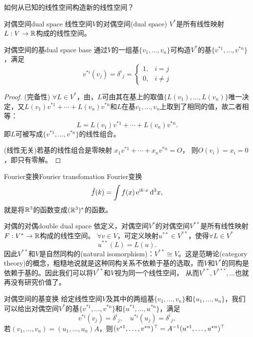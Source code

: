 如何从已知的线性空间构造新的线性空间？
\begin{definition}{对偶空间}{dual space}
	线性空间$V$的对偶空间(dual space) $V^\ast$是所有线性映射$L:V\to\mathbb R$构成的线性空间。
\end{definition}
\begin{theorem}{对偶空间的基}{dual space base}
	通过$V$的一组基$\{v_1,\ldots,v_n\}$可构造$V^\ast$的基$\{v^{\ast 1},\ldots,v^{\ast n}\}$，满足
	\begin{equation}
		v^{\ast i}(v_j)=\delta^i{}_j=
		\begin{cases}
			1,&i=j\\0,&i\neq j
		\end{cases}
	\end{equation}
\end{theorem}
\begin{proof}
	(完备性) $\forall L\in V^\ast$，由，$L$可由其在基上的取值$\{L(v_1),\ldots,L(v_n)\}$唯一决定，又$L(v_1)v^{\ast 1}+\cdots+L(v_n)v^{\ast n}$和$L$在基$v_1,\ldots,v_n$上取到了相同的值，故二者相等：
	\[
		L=L(v_1)v^{\ast 1}+\cdots+L(v_n)v^{\ast n}.
	\]
	即$L$可被写成$\{v^{\ast 1},\ldots,v^{\ast n}\}$的线性组合。

	(线性无关)若基的线性组合是零映射
	$x_1v^{\ast 1}+\cdots+x_nv^{\ast n}=O$，
	则$O(v_i)=x_i=0$，即只有零解。
\end{proof}
\begin{example}{Fourier变换}{Fourier transfomation}
	Fourier变换
	\[
		\hat f(k)=\int f(x)\mathop{}\!\mathrm{e}^{\mathrm{i} k\cdot x}\mathop{}\!\mathrm{d}^3x,
	\]
	就是将$\mathbb R^3$的函数变成$(\mathbb R^3)^\ast$的函数。
\end{example}
\begin{example}{对偶的对偶}{double dual space}
	依定义，对偶空间$V^\ast$的对偶空间$V^{\ast\ast}$是所有线性映射$F:V^\ast\to\mathbb R$构成的线性空间。%
	$\forall v\in V$，可定义映射$u^{\ast\ast}\in V^{\ast\ast}$，使得$\forall L\in V^\ast$
	\begin{equation}
		u^{\ast\ast}(L)=L(u).
	\end{equation}
	因此$V^{\ast\ast}$和$V$是自然同构的(natural isomorphism)：$V^{\ast\ast}\cong V$。这是范畴论(category theory)的概念，粗糙地说就是这种同构关系不依赖于基的选取，而$V$和$V^\ast$的同构是依赖于基的。因此我们可以将$V^{\ast\ast}$和$V$视为同一个线性空间，
	从而$V^{\ast\ast},V^{\ast\ast\ast},\ldots$也就再没有研究价值了。
\end{example}
\begin{theorem}{对偶空间的基变换}{}
	给定线性空间$V$及其中的两组基$\{v_1,\ldots,v_n\}$和$\{u_1,\ldots,u_n\}$，我们可以给出对偶空间$V^\ast$的基$\{v^{\ast 1},\ldots,v^{\ast n}\}$和$\{u^{\ast 1},\ldots,u^{\ast n}\}$，满足
	\[
		v^{\ast i}(v_j)=\delta^i{}_j,\quad u^{\ast i}(u_j)=\delta^i{}_j,
	\]
	若$(v_1,\ldots,v_n)=(u_1,\ldots,u_n)A$，则$(v^{\ast 1},\ldots,v^{\ast n})^\top=A^{-1}(u^{\ast 1},\ldots,u^{\ast n})^\top$
\end{theorem}
